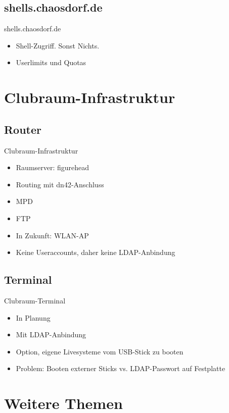 \documentclass{beamer}
\begin{document}
\subsection{shells.chaosdorf.de}
\begin{frame}{shells.chaosdorf.de}
	\begin{itemize}
		\item Shell-Zugriff. Sonst Nichts.
		\item Userlimits und Quotas
	\end{itemize}
\end{frame}

\section{Clubraum-Infrastruktur}
\subsection{Router}
\begin{frame}{Clubraum-Infrastruktur}
	\begin{itemize}
		\item Raumserver: figurehead
		\item Routing mit dn42-Anschluss
		\item MPD
		\item FTP
		\item In Zukunft: WLAN-AP
		\item Keine Useraccounts, daher keine LDAP-Anbindung
	\end{itemize}
\end{frame}

\subsection{Terminal}
\begin{frame}{Clubraum-Terminal}
	\begin{itemize}
		\item In Planung
		\item Mit LDAP-Anbindung
		\item Option, eigene Livesysteme vom USB-Stick zu booten
		\item Problem: Booten externer Sticks vs. LDAP-Passwort auf
			Festplatte
	\end{itemize}
\end{frame}

\section{Weitere Themen}
\end{document}
